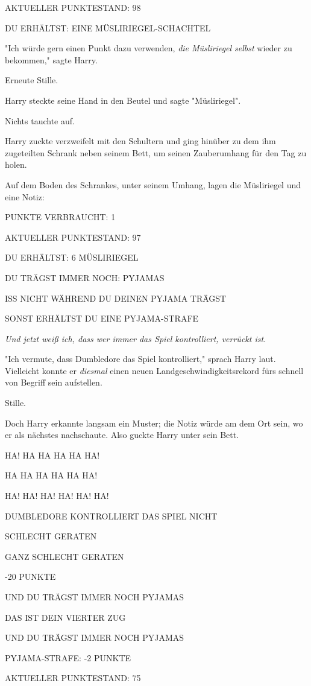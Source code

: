 {AKTUELLER PUNKTESTAND: 98

DU ERHÄLTST: EINE MÜSLIRIEGEL-SCHACHTEL

"Ich würde gern einen Punkt dazu verwenden, \emph{die Müsliriegel selbst} wieder zu bekommen," sagte Harry.

Erneute Stille.

Harry steckte seine Hand in den Beutel und sagte "Müsliriegel".

Nichts tauchte auf.

Harry zuckte verzweifelt mit den Schultern und ging hinüber zu dem ihm zugeteilten Schrank neben seinem Bett, um seinen Zauberumhang für den Tag zu holen.

Auf dem Boden des Schrankes, unter seinem Umhang, lagen die Müsliriegel und eine Notiz:

PUNKTE VERBRAUCHT: 1

AKTUELLER PUNKTESTAND: 97

DU ERHÄLTST: 6 MÜSLIRIEGEL

DU TRÄGST IMMER NOCH: PYJAMAS

ISS NICHT WÄHREND DU DEINEN PYJAMA TRÄGST

SONST ERHÄLTST DU EINE PYJAMA-STRAFE

\emph{Und jetzt weiß ich, dass wer immer das Spiel kontrolliert, verrückt ist.}

"Ich vermute, dass Dumbledore das Spiel kontrolliert," sprach Harry laut. Vielleicht konnte er \emph{diesmal} einen neuen Landgeschwindigkeitsrekord fürs schnell von Begriff sein aufstellen.

Stille.

Doch Harry erkannte langsam ein Muster; die Notiz würde am dem Ort sein, wo er als nächstes nachschaute. Also guckte Harry unter sein Bett.

HA! HA HA HA HA HA!

HA HA HA HA HA HA!

HA! HA! HA! HA! HA! HA!

DUMBLEDORE KONTROLLIERT DAS SPIEL NICHT

SCHLECHT GERATEN

GANZ SCHLECHT GERATEN

-20 PUNKTE

UND DU TRÄGST IMMER NOCH PYJAMAS

DAS IST DEIN VIERTER ZUG

UND DU TRÄGST IMMER NOCH PYJAMAS

PYJAMA-STRAFE: -2 PUNKTE

AKTUELLER PUNKTESTAND: 75

}
